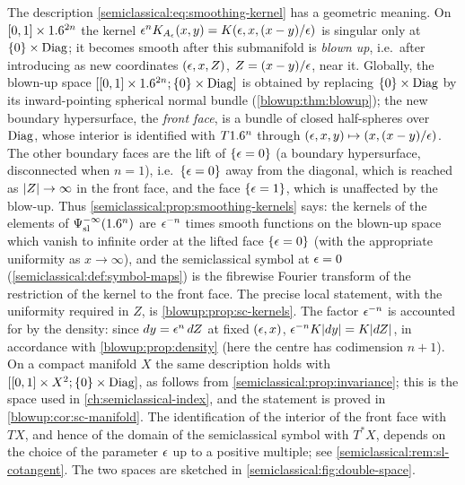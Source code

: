 \begin{remark}\label{semiclassical:rem:double-space}
  The description \eqref{semiclassical:eq:smoothing-kernel} has a geometric
  meaning. On $[0,1]\times1.6^{2n}$ the kernel $\epsilon^nK_{A_\epsilon}(x,y)=K(\epsilon,x,(x-y)/\epsilon)$
  is singular only at $\{0\}\times\operatorname{Diag}$; it becomes smooth after this
  submanifold is \emph{blown up}, i.e.\ after introducing as new coordinates
  $(\epsilon,x,Z)$, $Z=(x-y)/\epsilon$, near it. Globally, the blown-up space
  $[[0,1]\times1.6^{2n};\{0\}\times\operatorname{Diag}]$ is obtained by replacing $\{0\}\times\operatorname{Diag}$
  by its inward-pointing spherical normal bundle (\cref{blowup:thm:blowup}); the new boundary hypersurface,
  the \emph{front face}, is a bundle of closed half-spheres over $\operatorname{Diag}$, whose
  interior is identified with $T1.6^n$ through $(\epsilon,x,y)\mapsto(x,(x-y)/\epsilon)$. The
  other boundary faces are the lift of $\{\epsilon=0\}$ (a boundary hypersurface,
  disconnected when $n=1$), i.e.\ $\{\epsilon=0\}$ away from
  the diagonal, which is reached as $\lvert Z\rvert\to\infty$ in the front face, and the
  face $\{\epsilon=1\}$, which is unaffected by the blow-up. Thus
  \cref{semiclassical:prop:smoothing-kernels} says: the kernels of the elements
  of $\Psi^{-\infty}_{\mathrm{sl}}(1.6^n)$ are $\epsilon^{-n}$ times smooth functions on the blown-up
  space which vanish to infinite order at the lifted face $\{\epsilon=0\}$ (with the
  appropriate uniformity as $x\to\infty$), and the semiclassical symbol at $\epsilon=0$
  (\cref{semiclassical:def:symbol-maps}) is the fibrewise Fourier transform of the
  restriction of the kernel to the front face. The precise local statement, with
  the uniformity required in $Z$, is \cref{blowup:prop:sc-kernels}. The factor
  $\epsilon^{-n}$ is accounted for by the density: since $dy=\epsilon^n\,dZ$ at fixed
  $(\epsilon,x)$, $\epsilon^{-n}K\lvert dy\rvert=K\lvert dZ\rvert$, in accordance with
  \cref{blowup:prop:density} (here the centre has codimension $n+1$). On a compact
  manifold $X$ the same description holds with $[[0,1]\times X^2;\{0\}\times\operatorname{Diag}]$, as
  follows from \cref{semiclassical:prop:invariance}; this is the space used in
  \cref{ch:semiclassical-index}, and the statement is proved in
  \cref{blowup:cor:sc-manifold}. The identification of the interior of the front face
  with $TX$, and hence of the domain of the semiclassical symbol with $T^*X$,
  depends on the choice of the parameter $\epsilon$ up to a positive multiple; see
  \cref{semiclassical:rem:sl-cotangent}. The two spaces are sketched in
  \cref{semiclassical:fig:double-space}.
\end{remark}

